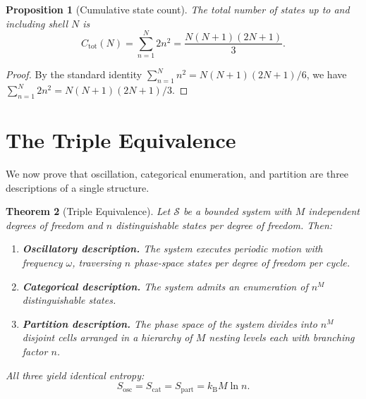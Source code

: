 \documentclass[10pt,twocolumn]{article}
\newtheorem{theorem}{Theorem}[section]
\newtheorem{proposition}[theorem]{Proposition}
\theoremstyle{definition}
\theoremstyle{remark}
\newcommand{\kB}{k_{\mathrm{B}}}
\begin{document}
\begin{proposition}[Cumulative state count]\label{prop:cumul}
The total number of states up to and including shell $N$ is
\begin{equation}\label{eq:cumul}
  C_{\mathrm{tot}}(N) = \sum_{n=1}^{N}2n^2
  = \frac{N(N+1)(2N+1)}{3}.
\end{equation}
\end{proposition}

\begin{proof}
By the standard identity $\sum_{n=1}^{N}n^2 =
N(N+1)(2N+1)/6$, we have $\sum_{n=1}^{N}2n^2 =
N(N+1)(2N+1)/3$.
\end{proof}

\section{The Triple Equivalence}\label{sec:triple}

We now prove that oscillation, categorical enumeration, and
partition are three descriptions of a single structure.

\begin{theorem}[Triple Equivalence]\label{thm:triple}
Let $\mathcal{S}$ be a bounded system with $M$ independent
degrees of freedom and $n$ distinguishable states per degree of
freedom.  Then:
\begin{enumerate}[label=(\roman*),leftmargin=*,itemsep=2pt]
\item \textbf{Oscillatory description.}  The system executes
  periodic motion with frequency $\omega$, traversing $n$
  phase-space states per degree of freedom per cycle.
\item \textbf{Categorical description.}  The system admits an
  enumeration of $n^M$ distinguishable states.
\item \textbf{Partition description.}  The phase space of the
  system divides into $n^M$ disjoint cells arranged in a
  hierarchy of $M$ nesting levels each with branching factor
  $n$.
\end{enumerate}
All three yield identical entropy:
\begin{equation}\label{eq:trip_S}
  S_{\mathrm{osc}} = S_{\mathrm{cat}} = S_{\mathrm{part}}
  = \kB M \ln n.
\end{equation}
\end{theorem}
\end{document}
